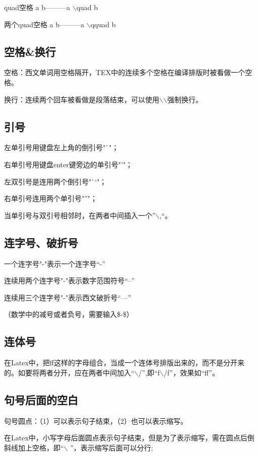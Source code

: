 \documentclass[UTF8]{ctexart}
\begin{document}
quad空格 a \quad b---------a $\backslash$quad b

两个quad空格	a \qquad b---------a $\backslash$qquad b


\subsection{空格\&换行}

空格：西文单词用空格隔开，TEX中的连续多个空格在编译排版时被看做一个空格。

换行：连续两个回车被看做是段落结束，可以使用$\backslash$$\backslash$强制换行。

\subsection{引号}

左单引号用键盘左上角的倒引号"`"；

右单引号用键盘enter键旁边的单引号"'"；

左双引号是连用两个倒引号"``"；

右单引号连用两个单引号"''"；

当单引号与双引号相邻时，在两者中间插入一个”$\backslash$,“。

\subsection{连字号、破折号}

一个连字号"-"表示一个连字号“-”

连续用两个连字号"-"表示数字范围符号“--”

连续用三个连字号"-"表示西文破折号“---”

（数学中的减号或者负号，需要输入\$-\$）

\subsection{连体号}

在Latex中，把ff这样的字母组合，当成一个连体号排版出来的，而不是分开来的。如要将两者分开，应在两者中间加入“$\backslash$/”,即“f$\backslash$/f”，效果如“f\/f”。

\subsection{句号后面的空白}

句号圆点：（1）可以表示句子结束，（2）也可以表示缩写。

在Latex中，小写字母后面圆点表示句子结束，但是为了表示缩写，需在圆点后倒斜线加上空格，即“$\backslash$ ”，表示缩写后面可以分行;
\end{document}
